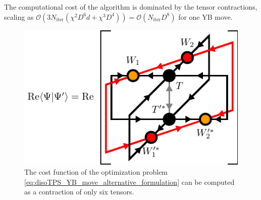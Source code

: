 The computational cost of the algorithm is dominated by the tensor contractions, scaling as $\mathcal{O}(3N_\text{iter}(\chi^2D^6d + \chi^3D^4)) = \mathcal{O}(N_\text{iter}D^8)$ for one YB move.
\begin{figure}
	\centering
	\includegraphics[scale=1]{figures/tikz/disoTPS/yang_baxter_move_iterative/yang_baxter_move_iterative_a.pdf}
	\caption{The cost function of the optimization problem \eqref{eq:disoTPS_YB_move_alternative_formulation} can be computed as a contraction of only six tensors.}
	\label{fig:YB_move_iterate_polar_overlap}
\end{figure}
